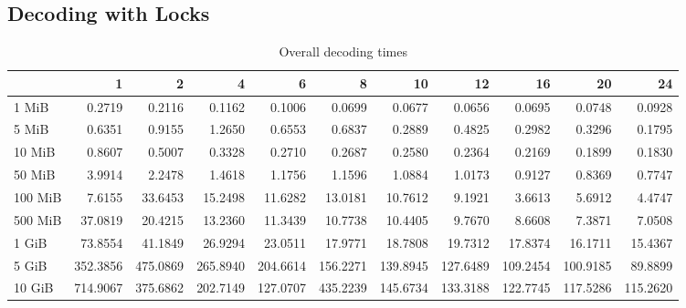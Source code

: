 \subsection{Decoding with Locks}
\begin{table}[!h]
	\caption{Overall decoding times}
\begin{tabular}{lrrrrrrrrrr}
	\toprule
		\diagbox{File sizes }{Threads}  &        1  &        2  &        4  &        6  &        8  &        10 &        12 &        16 &        20 &        24 \\
	\midrule
	1 MiB   &    0.2719 &    0.2116 &    0.1162 &    0.1006 &    0.0699 &    0.0677 &    0.0656 &    0.0695 &    0.0748 &    0.0928 \\
	5 MiB   &    0.6351 &    0.9155 &    1.2650 &    0.6553 &    0.6837 &    0.2889 &    0.4825 &    0.2982 &    0.3296 &    0.1795 \\
	10 MiB  &    0.8607 &    0.5007 &    0.3328 &    0.2710 &    0.2687 &    0.2580 &    0.2364 &    0.2169 &    0.1899 &    0.1830 \\
	50 MiB  &    3.9914 &    2.2478 &    1.4618 &    1.1756 &    1.1596 &    1.0884 &    1.0173 &    0.9127 &    0.8369 &    0.7747 \\
	100 MiB &    7.6155 &   33.6453 &   15.2498 &   11.6282 &   13.0181 &   10.7612 &    9.1921 &    3.6613 &    5.6912 &    4.4747 \\
	500 MiB &   37.0819 &   20.4215 &   13.2360 &   11.3439 &   10.7738 &   10.4405 &    9.7670 &    8.6608 &    7.3871 &    7.0508 \\
	1 GiB   &   73.8554 &   41.1849 &   26.9294 &   23.0511 &   17.9771 &   18.7808 &   19.7312 &   17.8374 &   16.1711 &   15.4367 \\
	5 GiB   &  352.3856 &  475.0869 &  265.8940 &  204.6614 &  156.2271 &  139.8945 &  127.6489 &  109.2454 &  100.9185 &   89.8899 \\
	10 GiB  &  714.9067 &  375.6862 &  202.7149 &  127.0707 &  435.2239 &  145.6734 &  133.3188 &  122.7745 &  117.5286 &  115.2620 \\
	\bottomrule
\end{tabular}
\end{table}

